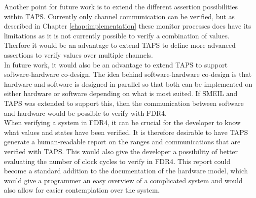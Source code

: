 Another point for future work is to extend the different assertion possibilities within TAPS. Currently only channel communication can be verified, but as described in Chapter \ref{chap:implementation} %
these monitor processes does have its limitations as it is not currently possible to verify a combination of values. Therfore it would be an advantage to extend TAPS to define more advanced assertions to verify values over multiple channels. \\

In future work, it would also be an advantage to extend TAPS to support software-hardware co-design. The idea behind software-hardware co-design is that hardware and software is designed in parallel so that both can be implemented on either hardware or software depending on what is most suited. If SMEIL and TAPS was extended to support this, then the communication between software and hardware would be possible to verify with FDR4. \\

When verifying a system in FDR4, it can be crucial for the developer to know what values and states have been verified. It is therefore desirable to have TAPS generate a human-readable report on the ranges and communications that are verified with TAPS. This would also give the developer a possibility of better evaluating the number of clock cycles to verify in FDR4.
This report could become a standard addition to the documentation of the hardware model, which would give a programmer an easy overview of a complicated system and would also allow for easier contemplation over the system.